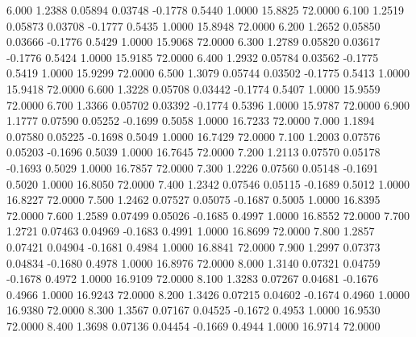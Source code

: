    6.000   1.2388   0.05894   0.03748  -0.1778   0.5440   1.0000  15.8825  72.0000
   6.100   1.2519   0.05873   0.03708  -0.1777   0.5435   1.0000  15.8948  72.0000
   6.200   1.2652   0.05850   0.03666  -0.1776   0.5429   1.0000  15.9068  72.0000
   6.300   1.2789   0.05820   0.03617  -0.1776   0.5424   1.0000  15.9185  72.0000
   6.400   1.2932   0.05784   0.03562  -0.1775   0.5419   1.0000  15.9299  72.0000
   6.500   1.3079   0.05744   0.03502  -0.1775   0.5413   1.0000  15.9418  72.0000
   6.600   1.3228   0.05708   0.03442  -0.1774   0.5407   1.0000  15.9559  72.0000
   6.700   1.3366   0.05702   0.03392  -0.1774   0.5396   1.0000  15.9787  72.0000
   6.900   1.1777   0.07590   0.05252  -0.1699   0.5058   1.0000  16.7233  72.0000
   7.000   1.1894   0.07580   0.05225  -0.1698   0.5049   1.0000  16.7429  72.0000
   7.100   1.2003   0.07576   0.05203  -0.1696   0.5039   1.0000  16.7645  72.0000
   7.200   1.2113   0.07570   0.05178  -0.1693   0.5029   1.0000  16.7857  72.0000
   7.300   1.2226   0.07560   0.05148  -0.1691   0.5020   1.0000  16.8050  72.0000
   7.400   1.2342   0.07546   0.05115  -0.1689   0.5012   1.0000  16.8227  72.0000
   7.500   1.2462   0.07527   0.05075  -0.1687   0.5005   1.0000  16.8395  72.0000
   7.600   1.2589   0.07499   0.05026  -0.1685   0.4997   1.0000  16.8552  72.0000
   7.700   1.2721   0.07463   0.04969  -0.1683   0.4991   1.0000  16.8699  72.0000
   7.800   1.2857   0.07421   0.04904  -0.1681   0.4984   1.0000  16.8841  72.0000
   7.900   1.2997   0.07373   0.04834  -0.1680   0.4978   1.0000  16.8976  72.0000
   8.000   1.3140   0.07321   0.04759  -0.1678   0.4972   1.0000  16.9109  72.0000
   8.100   1.3283   0.07267   0.04681  -0.1676   0.4966   1.0000  16.9243  72.0000
   8.200   1.3426   0.07215   0.04602  -0.1674   0.4960   1.0000  16.9380  72.0000
   8.300   1.3567   0.07167   0.04525  -0.1672   0.4953   1.0000  16.9530  72.0000
   8.400   1.3698   0.07136   0.04454  -0.1669   0.4944   1.0000  16.9714  72.0000
